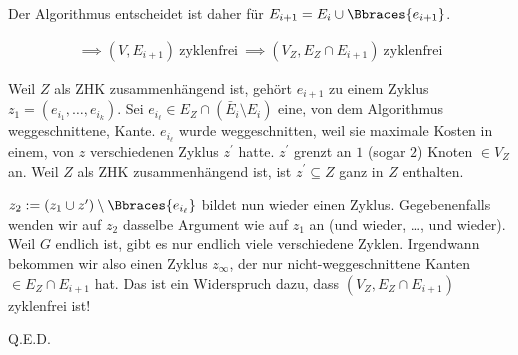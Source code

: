 \begin{solution}
\begin{enumerate}[label = (\Alph*)]
\begin{enumerate}[label = \arabic*.]
\begin{enumerate}[label = 2.\arabic*.]
            Der Algorithmus entscheidet ist daher für $E_{i+1} = E_i \cup \Bbraces{e_{i+1}}$.

            \begin{align*}
                \implies
                (V, E_{i+1}) ~\text{zyklenfrei}~
                \implies
                (V_Z, E_Z \cap E_{i+1}) ~\text{zyklenfrei}
            \end{align*}

            Weil $Z$ als ZHK zusammenhängend ist, gehört $e_{i+1}$ zu einem Zyklus $z_1 = (e_{i_1}, \dots, e_{i_k})$.
            Sei $e_{i_\ell} \in E_Z \cap (\bar E_i \setminus E_i)$ eine, von dem Algorithmus weggeschnittene, Kante.
            $e_{i_\ell}$ wurde weggeschnitten, weil sie maximale Kosten in einem, von $z$ verschiedenen Zyklus $z^\prime$ hatte.
            $z^\prime$ grenzt an $1$ (sogar $2$) Knoten $\in V_Z$ an.
            Weil $Z$ als ZHK zusammenhängend ist, ist $z^\prime \subseteq Z$ ganz in $Z$ enthalten.

            $z_2 := (z_1 \cup z^\prime) \setminus \Bbraces{e_{i_\ell}}$ bildet nun wieder einen Zyklus.
            Gegebenenfalls wenden wir auf $z_2$ dasselbe Argument wie auf $z_1$ an (und wieder, \dots, und wieder).
            Weil $G$ endlich ist, gibt es nur endlich viele verschiedene Zyklen.
            Irgendwann bekommen wir also einen Zyklus $z_\infty$, der nur nicht-weggeschnittene Kanten $\in E_Z \cap E_{i+1}$ hat.
            Das ist ein Widerspruch dazu, dass $(V_Z, E_Z \cap E_{i+1})$ zyklenfrei ist!

        \end{enumerate}

    \end{enumerate}

    Q.E.D.

    \begin{comment}
    Wir behaupten also, dass $G_n:=(V,E_n)$ ein minimaler Spannbaum ist. Wir arbeiten alle Eigenschaften ab.
    \begin{enumerate}
    	\item $G_n$ ist zyklenfrei. Dies folgt aus obiger Bemerkung.

    	\item Angenommen $G_n$ wäre nicht zusammenhängend. Betrachten wir also zwei Zusammenhangskomponeneten $Z_1$ und $Z_2$ dieses Graphen. Das heißt aus jedem Pfad der $Z_1$ und $Z_2$ verbindet wird eine Kante durch den Algorithmus gelöscht. Wir betrachten einen Zeitpunkt, zu dem nur mehr ein Pfad intakt ist. Jede Kante in diesem Pfad kann dann aber nicht mehr in einem Zykel vorkommen, also auch nicht gelöscht werden, ein Widerspruch!

    	\item Die Frage ist: Ist dieser Spannbaum auch wirklich minimal??
    \end{enumerate}
    \end{comment}

\end{enumerate}

\end{solution}

